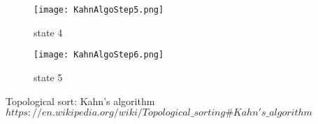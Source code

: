 \documentclass[12pt]{article}
\begin{document}
    
    \begin{figure}[H]
\centering
\texttt{[image: KahnAlgoStep5.png]}
\caption{state 4 }
\end{figure}

\begin{figure}[H]
\centering
\texttt{[image: KahnAlgoStep6.png]}
\caption{state 5}
\end{figure}
    
    


\begin{thebibliography}{1}
Topological sort: Kahn's algorithm
\\\texttt{$https://en.wikipedia.org/wiki/Topological\_sorting\#Kahn's\_algorithm$}

\end{thebibliography}
\end{document}
